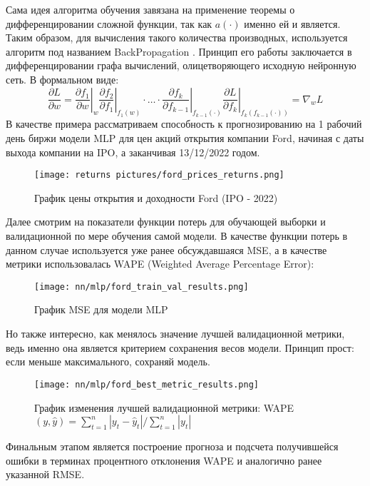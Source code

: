 Сама идея алгоритма обучения завязана на применение теоремы о дифференцировании сложной функции, так как $a(\cdot)$ именно ей и является. Таким образом, для вычисления такого количества производных, используется алгоритм под названием BackPropagation \cite{linnainmaa1970representation}. Принцип его работы заключается в дифференцировании графа вычислений, олицетворяющего исходную нейронную сеть. В формальном виде:
\begin{equation}
	\frac{\partial L}{\partial w} = \left. \frac{\partial f_1}{\partial w} \right\rvert_w \left. \frac{\partial f_2}{\partial f_1} \right\rvert_{f_1(w)} \cdot \ldots \cdot \left. \frac{\partial f_k}{\partial f_{k - 1}} \right\rvert_{f_{k - 1}(\cdot)} \left. \frac{\partial L}{\partial f_k} \right\rvert_{f_k\left(f_{k - 1}(\cdot)\right)} = \nabla_w L
\end{equation}
В качестве примера рассматриваем способность к прогнозированию на 1 рабочий день биржи модели MLP для цен акций открытия компании Ford, начиная с даты выхода компании на IPO, а заканчивая 13/12/2022 годом.
\begin{figure}[H]
	\centering
	\texttt{[image: returns pictures/ford\_prices\_returns.png]}
	\caption{График цены открытия и доходности Ford (IPO - 2022)}
	\label{fig::ford_prices_returns}
\end{figure}
Далее смотрим на показатели функции потерь для обучающей выборки и валидационной по мере обучения самой модели. В качестве функции потерь в данном случае используется уже ранее обсуждавшаяся MSE, а в качестве метрики использовалась WAPE (Weighted Average Percentage Error):
\begin{figure}[H]
	\centering
	\texttt{[image: nn/mlp/ford\_train\_val\_results.png]}
	\caption{График MSE для модели MLP}
	\label{fig::ford_train_val_results}
\end{figure}
Но также интересно, как менялось значение лучшей валидационной метрики, ведь именно она является критерием сохранения весов модели. Принцип прост: если меньше максимального, сохраняй модель.
\begin{figure}[H]
	\centering
	\texttt{[image: nn/mlp/ford\_best\_metric\_results.png]}
	\caption{График изменения лучшей валидационной метрики: WAPE$(y, \hat{y}) = \sum_{t = 1}^n |y_t - \hat{y}_t| / \sum_{t = 1}^n |y_t|$}
	\label{fig::ford_train_best_metric_results}
\end{figure}
Финальным этапом является построение прогноза и подсчета получившейся ошибки в терминах процентного отклонения WAPE и аналогично ранее указанной RMSE.
